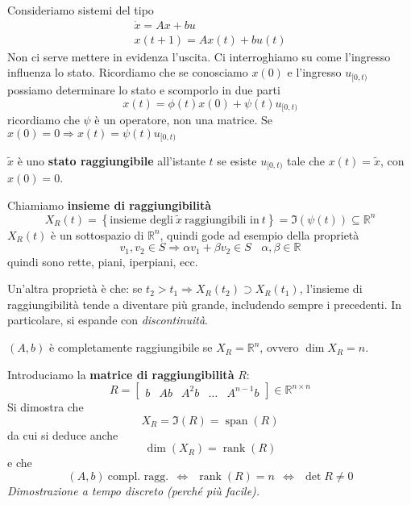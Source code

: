 \documentclass[10pt,a4paper]{book}
\DeclareMathOperator{\rank}{rank}
\DeclareMathOperator{\Span}{span}
\begin{document}
Consideriamo sistemi del tipo
\begin{gather*}
	\dot{x} =Ax+bu\\
	x(t+1) =Ax(t) +bu(t)
\end{gather*}
Non ci serve mettere in evidenza l'uscita. Ci interroghiamo su come l'ingresso influenza lo stato. Ricordiamo che se conosciamo $x(0)$ e l'ingresso $u_{[ 0,t)}$ possiamo determinare lo stato e scomporlo in due parti
\begin{equation*}
	x(t) =\phi (t) x(0) +\psi (t) u_{[ 0,t)}
\end{equation*}
ricordiamo che $\psi $ è un operatore, non una matrice. Se $x(0) =0\Rightarrow x(t) =\psi (t) u_{[ 0,t)}$
\begin{definition}
	$\tilde{x}$ è uno \textbf{stato raggiungibile} all'istante $t$ se esiste $u_{[ 0,t)}$ tale che $x(t) =\tilde{x}$, con $x(0) =0$.
\end{definition}
Chiamiamo \textbf{insieme di raggiungibilità}
\begin{equation*}
	X_R(t) =\left\{\text{insieme degli} \ \tilde{x} \ \text{raggiungibili in} \ t\right\} =\Im(\psi (t)) \subseteq \mathbb{R}^n
\end{equation*}
$X_R(t)$ è un sottospazio di $\mathbb{R}^n$, quindi gode ad esempio della proprietà
\begin{equation*}
	v_1 ,v_2 \in S\Rightarrow \alpha v_1 +\beta v_2 \in S\ \ \ \ \alpha ,\beta \in \mathbb{R}
\end{equation*}
quindi sono rette, piani, iperpiani, ecc.

Un'altra proprietà è che: se $t_2  >t_1 \Rightarrow X_R(t_2) \supset X_R(t_1)$, l'insieme di raggiungibilità tende a diventare più grande, includendo sempre i precedenti. In particolare, si espande con \textit{discontinuità}.
\begin{definition}
	$(A,b)$ è completamente raggiungibile se $X_R =\mathbb{R}^n$, ovvero $\dim X_R =n$.
\end{definition}
Introduciamo la \textbf{matrice di raggiungibilità} $R$:
\begin{equation*}
	\boxed{
		R=\begin{bmatrix}
		b & Ab & A^2 b & \dotsc  & A^{n-1} b
		\end{bmatrix} \in \mathbb{R}^{n\times n}
	}
\end{equation*}
Si dimostra che
\begin{equation*}
	X_R =\Im(R) =\Span(R)
\end{equation*}
da cui si deduce anche
\begin{equation*}
	\dim(X_R) =\rank(R)
\end{equation*}
e che
\begin{equation*}
	(A,b) \ \text{compl. ragg.} \ \ \Leftrightarrow \ \ \rank(R) =n\ \ \Leftrightarrow \ \ \det R\neq 0
\end{equation*}
\textit{Dimostrazione a tempo discreto (perché più facile).}
\end{document}
